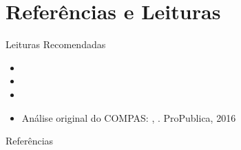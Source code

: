 \documentclass[aspectratio=169,xcolor=dvipsnames]{beamer}
\begin{document}
  \section*{Referências e Leituras}

  \begin{frame}{Leituras Recomendadas}
    \leiturasize
    \begin{itemize}\setlength{\itemsep}{0.5em}
      \item {}
      \item {}
      \item {}
      \item Análise original do COMPAS: \citeauthor{angwin2016machine}, . ProPublica, 2016
    \end{itemize}
  \end{frame}

  \begin{frame}[allowframebreaks]{Referências}
    \sloppy
    \printbibliography[heading=none]
  \end{frame}
\end{document}
